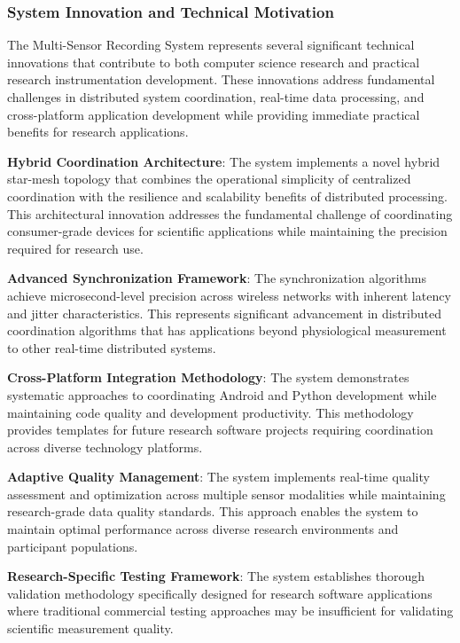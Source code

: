 \documentclass[11pt,a4paper]{article}
\begin{document}
\subsubsection{System Innovation and Technical Motivation}

The Multi-Sensor Recording System represents several significant technical
innovations that contribute to both computer
science research and practical research instrumentation development.  These
innovations address fundamental challenges in
distributed system coordination, real-time data processing, and cross-platform
application development while providing
immediate practical benefits for research applications.

\textbf{Hybrid Coordination Architecture}: The system implements a novel hybrid star-mesh topology that combines the
operational simplicity of centralized coordination with the resilience and
scalability benefits of distributed
processing.  This architectural innovation addresses the fundamental challenge of
coordinating consumer-grade devices for
scientific applications while maintaining the precision required for research use.

\textbf{Advanced Synchronization Framework}: The synchronization algorithms achieve microsecond-level precision across
wireless networks with inherent latency and jitter characteristics.  This represents
significant advancement in
distributed coordination algorithms that has applications beyond physiological
measurement to other real-time
distributed systems.

\textbf{Cross-Platform Integration Methodology}: The system demonstrates systematic approaches to coordinating Android and
Python development while maintaining code quality and development productivity.  This
methodology provides templates for
future research software projects requiring coordination across diverse technology
platforms.

\textbf{Adaptive Quality Management}: The system implements real-time quality assessment and optimization across multiple
sensor modalities while maintaining research-grade data quality standards.  This
approach enables the system to maintain
optimal performance across diverse research environments and participant populations.

\textbf{Research-Specific Testing Framework}: The system establishes thorough validation methodology specifically
designed for research software applications where traditional commercial testing
approaches may be insufficient for
validating scientific measurement quality.
\end{document}
